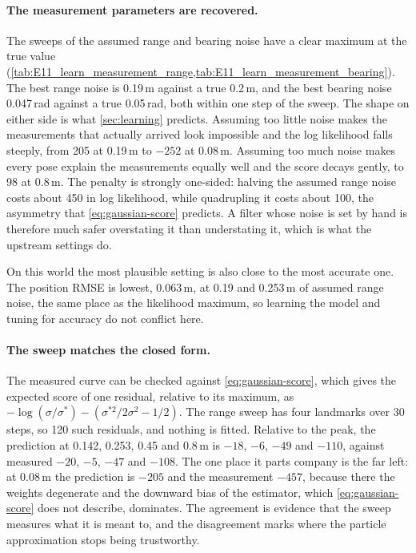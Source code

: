 \paragraph{The measurement parameters are recovered.} The sweeps of the assumed range and bearing noise have a
clear maximum at the true value (\cref{tab:E11_learn_measurement_range,tab:E11_learn_measurement_bearing}). The
best range noise is 0.19\,m against a true 0.2\,m, and the best bearing noise 0.047\,rad against a true
0.05\,rad, both within one step of the sweep. The shape on either side is what \cref{sec:learning} predicts.
Assuming too little noise makes the measurements that actually arrived look impossible and the log likelihood
falls steeply, from 205 at 0.19\,m to $-252$ at 0.08\,m. Assuming too much noise makes every pose explain the
measurements equally well and the score decays gently, to 98 at 0.8\,m. The penalty is strongly one-sided:
halving the assumed range noise costs about 450 in log likelihood, while quadrupling it costs about 100, the
asymmetry that \eqref{eq:gaussian-score} predicts. A filter whose noise is set by hand is therefore much safer
overstating it than understating it, which is what the upstream settings do.

On this world the most plausible setting is also close to the most accurate one. The position RMSE is lowest,
0.063\,m, at 0.19 and 0.253\,m of assumed range noise, the same place as the likelihood maximum, so learning the
model and tuning for accuracy do not conflict here.

\paragraph{The sweep matches the closed form.} The measured curve can be checked against
\eqref{eq:gaussian-score}, which gives the expected score of one residual, relative to its maximum, as
$-\log(\sigma/\sigma^*) - (\sigma^{*2}/2\sigma^{2} - 1/2)$. The range sweep has four landmarks over 30 steps,
so 120 such residuals, and nothing is fitted. Relative to the peak, the prediction at 0.142, 0.253, 0.45 and
0.8\,m is $-18$, $-6$, $-49$ and $-110$, against measured $-20$, $-5$, $-47$ and $-108$. The one place it parts
company is the far left: at 0.08\,m the prediction is $-205$ and the measurement $-457$, because there the
weights degenerate and the downward bias of the estimator, which \eqref{eq:gaussian-score} does not describe,
dominates. The agreement is evidence that the sweep measures what it is meant to, and the disagreement marks
where the particle approximation stops being trustworthy.

